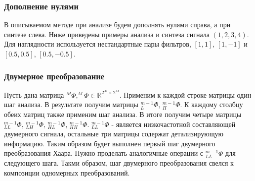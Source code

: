 \documentclass{article}
\begin{document}
\subsubsection{Дополнение нулями}
В описываемом методе при анализе будем дополнять нулями справа, а при синтезе слева. Ниже приведены примеры анализа и синтеза сигнала $(1,2,3,4)$. Для наглядности используется нестандартные пары фильтров, $[1,1]$, $[1,-1]$ и $[0.5,0.5]$, $[0.5,-0.5]$.
\begin{center}
\end{center}


\subsubsection{Двумерное преобразование}
Пусть дана матрица $^{M}\Phi, ^{M}\Phi \in \mathbb{R}^{2^{M}\times2^{M}}$. Применим к каждой строке матрицы один шаг анализа. В результате получим матрицы $_L^{m-1}\Phi$, $_H^{m-1}\Phi$. К каждому столбцу обеих матриц также применим шаг анализа. В итоге получим четыре матрицы $_{LL}^{m-1}\Phi$, $_{LH}^{m-1}\Phi$, $_{HL}^{m-1}\Phi$, $_{HH}^{m-1}\Phi$. $_{LL}^{m-1}\Phi$ - является низкочастотной составляющей двумерного сигнала, остальные три матрицы содержат детализирующую информацию. Таким образом будет выполнен первый шаг двумерного преобразования Хаара. Нужно проделать аналогичные операции с $_{LL}^{m-1}\Phi$ для следующего шага. Такми образом, шаг двумерного преобразования свелся к композиции одномерных преобразований.
\end{document}
